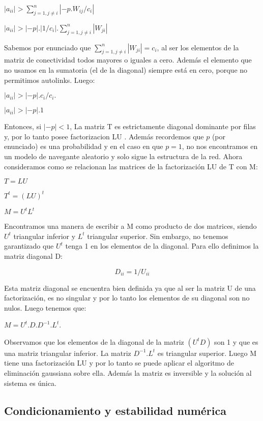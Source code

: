 $   |a_{ii}| > \sum_{j = 1, j \neq i}^n |-p.W_{ij}/c_i| $
    
$   |a_{ii}| > |-p|.|1/c_i|. \sum_{j = 1, j \neq i}^n |W_{ji}|$

Sabemos por enunciado que $\sum_{j = 1, j \neq i}^n |W_{ji}| = c_i$, al ser los elementos de la matriz de conectividad todos mayores o iguales a cero. Además el elemento que no usamos en la sumatoria (el de la diagonal) siempre está en cero, porque no permitimos autolinks. Luego:


$   |a_{ii}| > |-p|. c_i/c_i.$

$   |a_{ii}| > |-p|.1 $

Entonces, si $|-p| < 1$, La matriz T es estrictamente diagonal dominante por filas y, por lo tanto posee factorizacion LU \cite{burden}. Además recordemos que $p$ (por enunciado) es una probabilidad y en el caso en que $p = 1$, no nos encontramos en un modelo de navegante aleatorio y solo sigue la estructura de la red. Ahora consideramos como se relacionan las matrices de la factorización LU de T con M: 


$T = LU$ 

$T^t = (LU)^t$ 

$M = U^tL^t$ 

Encontramos una manera de escribir a M como producto de dos matrices, siendo $U^t$ triangular inferior y $L^t$ triangular superior. Sin embargo, no tenemos garantizado que $U^t$ tenga 1 en los elementos de la diagonal. Para ello definimos la matriz diagonal D:

\begin{equation}
    \label{defD}
    D_{ii} = 1/U_{ii} 
\end{equation}

Esta matriz diagonal se encuentra bien definida ya que al ser la matriz U de una factorización, es no singular y por lo tanto los elementos de su diagonal son no nulos. Luego tenemos que:

$M = U^t.D.D^{-1}.L^t$. 

Observamos que los elementos de la diagonal de la matriz $(U^tD)$ son 1 y que es una matriz triangular inferior. La matriz $D^{-1}.L^t$ es triangular superior. Luego M tiene una factorización LU y por lo tanto se puede aplicar el algoritmo de eliminación gaussiana sobre ella. Además la matriz es inversible y la solución al sistema es única.

\subsection{Condicionamiento y estabilidad numérica}


